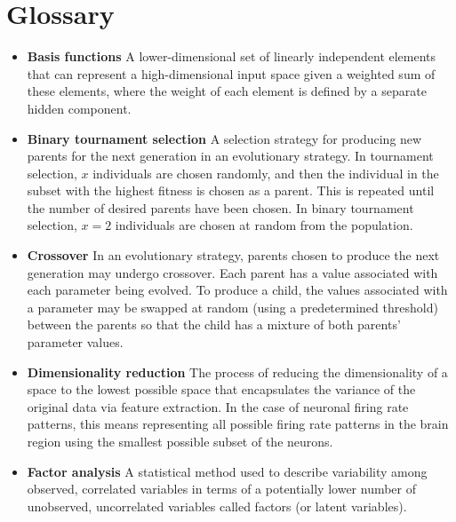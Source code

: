 
\section{Glossary}

\begin{itemize}

\item \textbf{Basis functions} A lower-dimensional set of linearly independent elements that can represent a high-dimensional input space given a weighted sum of these elements, where the weight of each element is defined by a separate hidden component.

\item \textbf{Binary tournament selection} A selection strategy for producing new parents for the next generation in an evolutionary strategy. In tournament selection, $x$ individuals are chosen randomly, and then the individual in the subset with the highest fitness is chosen as a parent. This is repeated until the number of desired parents have been chosen. In binary tournament selection, $x = 2$ individuals are chosen at random from the population.

\item \textbf{Crossover} In an evolutionary strategy, parents chosen to produce the next generation may undergo crossover. Each parent has a value associated with each parameter being evolved. To produce a child, the values associated with a parameter may be swapped at random (using a predetermined threshold) between the parents so that the child has a mixture of both parents' parameter values.

\item \textbf{Dimensionality reduction} The process of reducing the dimensionality of a space to the lowest possible space that encapsulates the variance of the original data via feature extraction. In the case of neuronal firing rate patterns, this means representing all possible firing rate patterns in the brain region using the smallest possible subset of the neurons.

\item \textbf{Factor analysis} A statistical method used to describe variability among observed, correlated variables in terms of a potentially lower number of unobserved, uncorrelated variables called factors (or latent variables).


\end{itemize}
